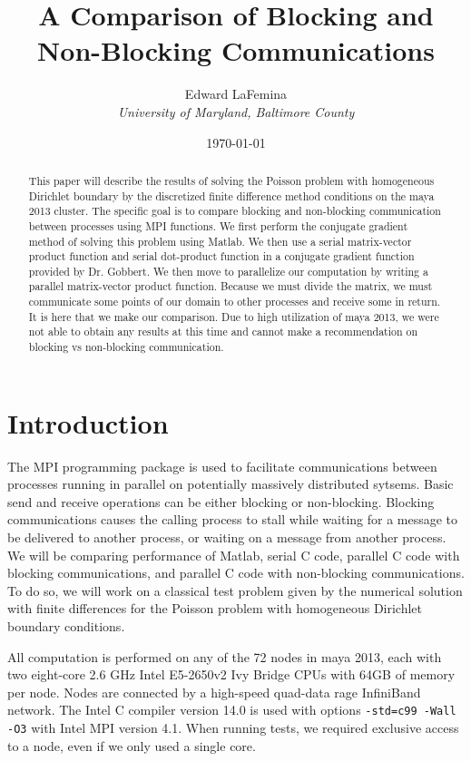 \documentclass[11pt]{article}
\author{Edward LaFemina \\
		\it{University of Maryland, Baltimore County}}
\title{A Comparison of Blocking and Non-Blocking Communications}
\date{\today}
\begin{document}
\maketitle

\begin{abstract}
This paper will describe the results of solving the Poisson problem with homogeneous Dirichlet boundary by the discretized finite difference method conditions on the maya 2013 cluster. The specific goal is to compare blocking and non-blocking communication between processes using MPI functions. We first perform the conjugate gradient method of solving this problem using Matlab. We then use a serial matrix-vector product function and serial dot-product function in a conjugate gradient function provided by Dr. Gobbert. We then move to parallelize our computation by writing a parallel matrix-vector product function. Because we must divide the matrix, we must communicate some points of our domain to other processes and receive some in return. It is here that we make our comparison. Due to high utilization of maya 2013, we were not able to obtain any results at this time and cannot make a recommendation  on blocking vs non-blocking communication.
\end{abstract}
\section{Introduction}
The MPI programming package is used to facilitate communications between processes running in parallel on potentially massively distributed sytsems. Basic send and receive operations can be either blocking or non-blocking. Blocking communications causes the calling process to stall while waiting for a message to be delivered to another process, or waiting on a message from another process. We will be comparing performance of Matlab, serial C code, parallel C code with blocking communications, and parallel C code with non-blocking communications. To do so, we will work on a classical test problem given by the numerical solution with finite differences for the Poisson problem with homogeneous Dirichlet boundary conditions.

All computation is performed on any of the 72 nodes in maya 2013, each with two eight-core 2.6 GHz Intel E5-2650v2 Ivy Bridge CPUs with 64GB of memory per node. Nodes are connected by a high-speed quad-data rage InfiniBand network. The Intel C compiler version 14.0 is used with options \texttt{-std=c99 -Wall -O3} with Intel MPI version 4.1. When running tests, we required exclusive access to a node, even if we only used a single core.
\end{document}
